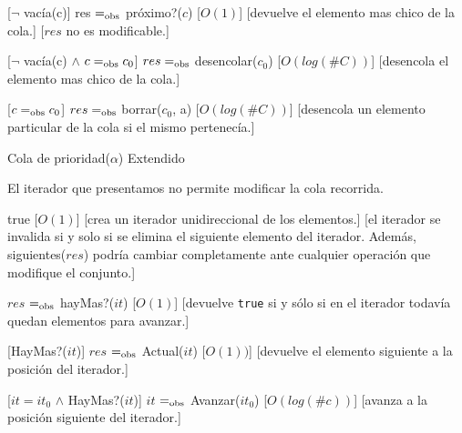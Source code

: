 \begin{Interfaz}
	[$\neg$ vacía(c)]
	{res $=_{\mathrm{obs}}$ próximo?($c$)}
	[$O(1)$]
	[devuelve el elemento mas chico de la cola.]
	[$res$ no es modificable.]

	[$\neg$ vacía(c) $\land$ $c =_{\mathrm{obs}} c_0$]
	{$res =_{\mathrm{obs}}$ desencolar($c_0$)}
	[$O(log(\#C))$]
	[desencola el elemento mas chico de la cola.]

	[$c =_{\mathrm{obs}} c_0$]
	{$res =_{\mathrm{obs}}$ borrar($c_0$, a)}
	[$O(log(\#C))$]
	[desencola un elemento particular de la cola si el mismo pertenecía.]


  \begin{tad}{Cola de prioridad($\alpha$) Extendido}
    \parskip=0pt
    
    \tadAxiomas
  \end{tad}


	El iterador que presentamos no permite modificar la cola recorrida.

	{true}
	[$O(1)$]
	[crea un iterador unidireccional de los elementos.]
	[el iterador se invalida si y solo si se elimina el siguiente elemento del iterador. Además, siguientes($res$) podría cambiar completamente ante cualquier operación que modifique el conjunto.]

	{$res$ $=_{\mathrm{obs}}$ hayMas?($it$)}
	[$O(1)$]
	[devuelve \texttt{true} si y sólo si en el iterador todavía quedan elementos para avanzar.]

	[HayMas?($it$)]
	{$res$ $=_{\mathrm{obs}}$ Actual($it$)}
	[$O(1))$]
	[devuelve el elemento siguiente a la posición del iterador.]

	[$it = it_0$ $\land$ HayMas?($it$)]
	{$it$ $=_{\mathrm{obs}}$ Avanzar($it_0$)}
	[$O(log(\#c))$]
	[avanza a la posición siguiente del iterador.]

\end{Interfaz}

